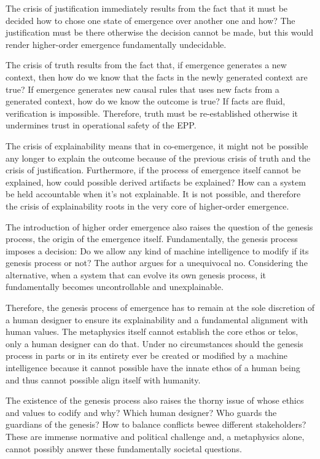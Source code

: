 The crisis of justification immediately results from the fact that it must be decided how to chose one state of emergence over another one and how? The justification must be there otherwise the decision cannot be made, but this would render higher-order emergence fundamentally undecidable. 

The crisis of truth results from the fact that, if emergence generates a new context, then how do we know that
the facts in the newly generated context are true? If emergence generates new causal rules that uses new facts from a generated context, how do we know the outcome is true? If facts are fluid, verification is impossible. Therefore, truth must be re-established otherwise it undermines trust in operational safety of the EPP. 

The crisis of explainability means that in co-emergence, it might not be possible any longer to explain the outcome because of the previous crisis of truth and the crisis of justification. Furthermore, if the process of emergence itself cannot be explained, how could possible derived artifacts be explained? How can a system be held accountable when it's not explainable. It is not possible, and therefore the crisis of explainability roots in the very core of higher-order emergence.

The introduction of higher order emergence also raises the question of the genesis process, 
the origin of the emergence itself. Fundamentally, the genesis process imposes a decision: Do we allow any kind of machine intelligence to modify if its genesis process or not? The author argues for a unequivocal no. 
Considering the alternative, when a system that can evolve its own genesis process, it fundamentally becomes uncontrollable and unexplainable. 

Therefore, the genesis process of emergence  has to remain at the sole discretion of a human designer to ensure its explainability and a fundamental alignment with human values. The metaphysics itself cannot establish the core ethos or telos, only a human designer can do that. Under no circumstances should the genesis process in parts or in its entirety ever be created or modified by a machine intelligence because it cannot possible have the innate ethos of a human being and thus cannot possible align itself with humanity. 

The existence of the genesis process also raises the thorny issue of whose ethics and values to codify and why? Which human designer? Who guards the guardians of the genesis? How to balance conflicts bewee different stakeholders? These are  immense normative and political challenge and, a metaphysics alone, cannot possibly answer these fundamentally societal questions. 

